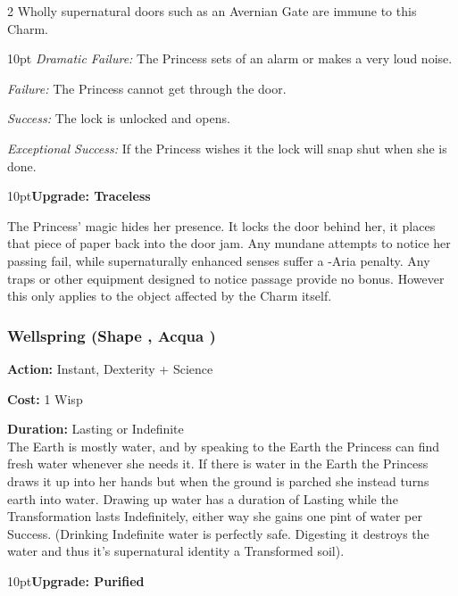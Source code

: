 \begin{multicols}{2}
Wholly supernatural doors such as an Avernian Gate are immune to this Charm.  

\begin{myindentpar}{10pt}    \emph{Dramatic Failure:} The Princess sets of an alarm or makes a very loud noise. 

\emph{Failure:} The Princess cannot get through the door. 

\emph{Success:} The lock is unlocked and opens.

\emph{Exceptional Success:} If the Princess wishes it the lock will snap shut when she is done.\end{myindentpar}

\begin{myindentpar}{10pt}\textbf{Upgrade: Traceless}

The Princess’ magic hides her presence. It locks the door behind her, it places that piece of paper back into the door jam. Any mundane attempts to notice her passing fail, while supernaturally enhanced senses suffer a -Aria penalty. Any traps or other equipment designed to notice passage provide no bonus. However this only applies to the object affected by the Charm itself. 

\end{myindentpar}

\subsubsection*{Wellspring (Shape \textbullet, Acqua \textbullet)}

\noindent \textbf{Action:} Instant, Dexterity + Science

\noindent \textbf{Cost:} 1 Wisp

\noindent \textbf{Duration:} Lasting or Indefinite\\

\noindent The Earth is mostly water, and by speaking to the Earth the Princess can find fresh water whenever she needs it. If there is water in the Earth the Princess draws it up into her hands but when the ground is parched she instead turns earth into water. Drawing up water has a duration of Lasting while the Transformation lasts Indefinitely, either way she gains one pint of water per Success. (Drinking Indefinite water is perfectly safe. Digesting it destroys the water and thus it's supernatural identity a Transformed soil).

\begin{myindentpar}{10pt}\textbf{Upgrade: Purified}


\end{myindentpar}
\end{multicols}
